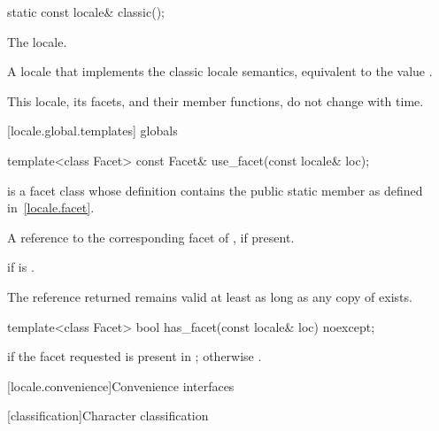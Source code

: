 %
\begin{itemdecl}
static const locale& classic();
\end{itemdecl}

\begin{itemdescr}
\pnum
The  locale.

\pnum
\returns
A locale that implements the classic  locale semantics,
equivalent to the value .

\pnum
\remarks
This locale, its facets, and their member functions, do not change with time.
\end{itemdescr}

[locale.global.templates]{ globals}

%
\begin{itemdecl}
template<class Facet> const Facet& use_facet(const locale& loc);
\end{itemdecl}

\begin{itemdescr}
\pnum
\mandates
{} is a facet class
whose definition contains the public static member 
as defined in~\ref{locale.facet}.

\pnum
\returns
A reference to the corresponding facet of , if present.

\pnum
\throws
{} if  is .

\pnum
\remarks
The reference returned remains valid
at least as long as any copy of  exists.
\end{itemdescr}

%
\begin{itemdecl}
template<class Facet> bool has_facet(const locale& loc) noexcept;
\end{itemdecl}

\begin{itemdescr}
\pnum
\returns
{} if the facet requested is present in ;
otherwise .
\end{itemdescr}

[locale.convenience]{Convenience interfaces}

[classification]{Character classification}

